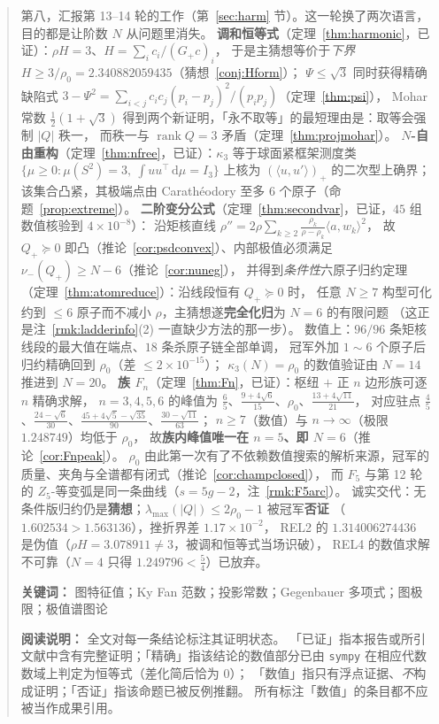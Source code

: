 \documentclass[UTF8,11pt]{ctexart}
\theoremstyle{definition}
\newcommand{\rank}{\operatorname{rank}}
\newcommand{\dd}{\,\mathrm{d}}
\begin{document}
\begin{abstract}
第八，汇报第 13--14 轮的工作（第~\ref{sec:harm} 节）。这一轮换了两次语言，目的都是让阶数 $N$ 从问题里消失。
\textbf{调和恒等式}（定理~\ref{thm:harmonic}，已证）：$\rho H=3$、$H=\sum_ic_i/(G_+c)_i$，
于是主猜想等价于\emph{下界} $H\ge3/\rho_0=2.340882059435$（猜想~\ref{conj:Hform}）；
$\Psi\le\sqrt3$ 同时获得精确缺陷式 $3-\Psi^2=\sum_{i<j}c_ic_j(p_i-p_j)^2/(p_ip_j)$（定理~\ref{thm:psi}），
Mohar 常数 $\frac12(1+\sqrt3)$ 得到两个新证明，「永不取等」的最短理由是：取等会强制 $|Q|$ 秩一，
而秩一与 $\rank Q=3$ 矛盾（定理~\ref{thm:projmohar}）。
\textbf{$N$-自由重构}（定理~\ref{thm:nfree}，已证）：$\kappa_3$ 等于球面紧框架测度类
$\{\mu\ge0:\mu(S^2)=3,\ \int uu^\top\dd\mu=I_3\}$ 上核为 $(\langle u,u'\rangle)_+$ 的二次型上确界；
该集合凸紧，其极端点由 Carathéodory 至多 $6$ 个原子（命题~\ref{prop:extreme}）。
\textbf{二阶变分公式}（定理~\ref{thm:secondvar}，已证，$45$ 组数值核验到 $4\times10^{-8}$）：
沿矩核直线 $\rho''=2\rho\sum_{k\ge2}\frac{\rho_k}{\rho-\rho_k}\langle a,w_k\rangle^2$，
故 $Q_+\succeq0$ 即凸（推论~\ref{cor:psdconvex}）、内部极值必须满足 $\nu_-(Q_+)\ge N-6$（推论~\ref{cor:nuneg}），
并得到\emph{条件性}六原子归约定理（定理~\ref{thm:atomreduce}）：沿线段恒有 $Q_+\succeq0$ 时，
任意 $N\ge7$ 构型可化约到 $\le6$ 原子而不减小 $\rho$，主猜想遂\textbf{完全化归}为 $N=6$ 的有限问题
（这正是注~\ref{rmk:ladderinfo}(2) 一直缺少方法的那一步）。
数值上：$96/96$ 条矩核线段的最大值在端点、$18$ 条杀原子链全部单调，
冠军外加 $1\sim6$ 个原子后归约精确回到 $\rho_0$（差 $\le2\times10^{-15}$）；
$\kappa_3(N)=\rho_0$ 的数值验证由 $N=14$ 推进到 $N=20$。
\textbf{族 $F_n$}（定理~\ref{thm:Fn}，已证）：枢纽 $+$ 正 $n$ 边形族可逐 $n$ 精确求解，
$n=3,4,5,6$ 的峰值为 $\frac65$、$\frac{9+4\sqrt6}{15}$、$\rho_0$、$\frac{13+4\sqrt{11}}{21}$，
对应驻点 $\frac45$、$\frac{24-\sqrt6}{30}$、$\frac{45+4\sqrt5-\sqrt{35}}{90}$、$\frac{30-\sqrt{11}}{63}$；
$n\ge7$（数值）与 $n\to\infty$（极限 $1.248749$）均低于 $\rho_0$，
故\textbf{族内峰值唯一在 $n=5$、即 $N=6$}（推论~\ref{cor:Fnpeak}）。
$\rho_0$ 由此第一次有了不依赖数值搜索的解析来源，冠军的质量、夹角与全谱都有闭式（推论~\ref{cor:champclosed}），
而 $F_5$ 与第 12 轮的 $Z_5$-等变弧是同一条曲线（$s=5g-2$，注~\ref{rmk:F5arc}）。
诚实交代：无条件版归约仍是\textbf{猜想}；$\lambda_{\max}(|Q|)\le2\rho_0-1$ 被冠军\textbf{否证}
（$1.602534>1.563136$），挫折界差 $1.17\times10^{-2}$，
REL2 的 $1.314006274436$ 是伪值（$\rho H=3.078911\ne3$，被调和恒等式当场识破），
REL4 的数值求解不可靠（$N=4$ 只得 $1.249796<\frac54$）已放弃。

\medskip
\noindent\textbf{关键词：} 图特征值；Ky Fan 范数；投影常数；Gegenbauer 多项式；图极限；极值谱图论

\medskip
\noindent\textbf{阅读说明：} 全文对每一条结论标注其证明状态。
「已证」指本报告或所引文献中含有完整证明；「精确」指该结论的数值部分已由
\texttt{sympy} 在相应代数数域上判定为恒等式（差化简后恰为 $0$）；
「数值」指只有浮点证据、\emph{不}构成证明；「否证」指该命题已被反例推翻。
所有标注「数值」的条目都不应被当作成果引用。
\end{abstract}
\end{document}
